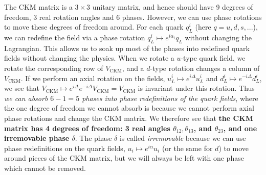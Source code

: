 \documentclass[11pt, oneside]{article}   	%
\theoremstyle{definition}
\numberwithin{equation}{subsection}		%
\begin{document}
The CKM matrix is a $3\times 3$ unitary matrix, and hence should have 9 degrees of freedom, 3 real rotation angles and 6 phases. 
However, we can use phase rotations to move these degrees of freedom around. For each quark $q_L^i$ (here $q = u, d, s, ...$), we can 
redefine the field via a phase rotation $q_L^i\mapsto e^{i\alpha_i} q_L$ without changing the Lagrangian. This allows us to soak up most of 
the phases into redefined quark fields without changing the physics. When we rotate a $u$-type quark field, we rotate the corresponding 
row of $V_\mathrm{CKM}$, and a $d$-type rotation changes a column of $V_\mathrm{CKM}$. If we perform an axial rotation on the fields, 
$u_L^i\mapsto e^{i\Delta} u_L^i$ and $d_L^i\mapsto e^{-i\Delta} d_L^i$, we see that $V_\mathrm{CKM}\mapsto e^{i\Delta} e^{-i\Delta} 
V_\mathrm{CKM} = V_\mathrm{CKM}$ is invariant under this rotation. Thus \textit{we can absorb $6 - 1 = 5$ phases into phase redefinitions 
of the quark fields}, where the one degree of freedom we cannot absorb is because we cannot perform axial phase rotations and change 
the CKM matrix. We therefore see that \textbf{the CKM matrix has 4 degrees of freedom: 3 real angles $\theta_{12}, \theta_{13}$, and 
$\theta_{23}$, and one irremovable phase $\delta$}. 
The phase $\delta$ is called \textit{irremovable} because we can use phase redefinitions on the quark fields, $u_i\mapsto e^{i\alpha} u_i$ 
(or the same for $d$) to move around pieces of the CKM matrix, but we will always be left with one phase which cannot be removed. 
\end{document}
